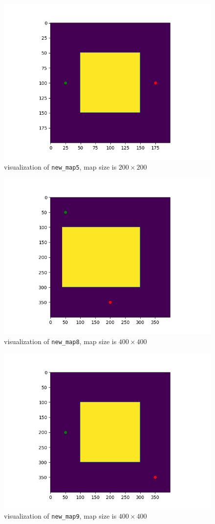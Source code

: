 \documentclass{article}
\begin{document}
\begin{figure}[H]
    \centering
    \includegraphics[width=0.8\linewidth]{new_map5.png}
    \caption{visualization of \texttt{new\_map5}, map size is $200 \times 200$ }
    \label{fig:map5}
\end{figure}
\begin{figure}[H]
    \centering
    \includegraphics[width=0.8\linewidth]{new_map8.png}
    \caption{visualization of \texttt{new\_map8}, map size is $400 \times 400$ }
    \label{fig:map8}
\end{figure}
\begin{figure}[H]
    \centering
    \includegraphics[width=0.8\linewidth]{new_map9.png}
    \caption{visualization of \texttt{new\_map9}, map size is $400 \times 400$ }
    \label{fig:map9}
\end{figure}
\end{document}
